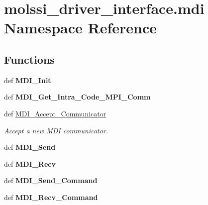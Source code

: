 \hypertarget{namespacemolssi__driver__interface_1_1mdi}{\section{molssi\-\_\-driver\-\_\-interface.\-mdi Namespace Reference}
\label{namespacemolssi__driver__interface_1_1mdi}
}
\subsection*{Functions}
\begin{DoxyCompactItemize}
\item 
\hypertarget{namespacemolssi__driver__interface_1_1mdi_a7fa45893a21039fbc4f4558adff09247}{def {\bfseries M\-D\-I\-\_\-\-Init}}\label{namespacemolssi__driver__interface_1_1mdi_a7fa45893a21039fbc4f4558adff09247}

\item 
\hypertarget{namespacemolssi__driver__interface_1_1mdi_a13123f38cd87a7834a1686f3620b26f5}{def {\bfseries M\-D\-I\-\_\-\-Get\-\_\-\-Intra\-\_\-\-Code\-\_\-\-M\-P\-I\-\_\-\-Comm}}\label{namespacemolssi__driver__interface_1_1mdi_a13123f38cd87a7834a1686f3620b26f5}

\item 
def \hyperlink{namespacemolssi__driver__interface_1_1mdi_a6491914c9c4bb9d3818f53895a735625}{M\-D\-I\-\_\-\-Accept\-\_\-\-Communicator}
\begin{DoxyCompactList}\small\item\em Accept a new M\-D\-I communicator. \end{DoxyCompactList}\item 
\hypertarget{namespacemolssi__driver__interface_1_1mdi_a75666a1612c8fde657f9783f3c42fcaf}{def {\bfseries M\-D\-I\-\_\-\-Send}}\label{namespacemolssi__driver__interface_1_1mdi_a75666a1612c8fde657f9783f3c42fcaf}

\item 
\hypertarget{namespacemolssi__driver__interface_1_1mdi_aad08bf01bdb806196e9a41140325b6ae}{def {\bfseries M\-D\-I\-\_\-\-Recv}}\label{namespacemolssi__driver__interface_1_1mdi_aad08bf01bdb806196e9a41140325b6ae}

\item 
\hypertarget{namespacemolssi__driver__interface_1_1mdi_a09f3c593e5222f1adbec84021f2b3f34}{def {\bfseries M\-D\-I\-\_\-\-Send\-\_\-\-Command}}\label{namespacemolssi__driver__interface_1_1mdi_a09f3c593e5222f1adbec84021f2b3f34}

\item 
\hypertarget{namespacemolssi__driver__interface_1_1mdi_aad3f7850b204cc18683005d43797bebc}{def {\bfseries M\-D\-I\-\_\-\-Recv\-\_\-\-Command}}\label{namespacemolssi__driver__interface_1_1mdi_aad3f7850b204cc18683005d43797bebc}

\end{DoxyCompactItemize}
